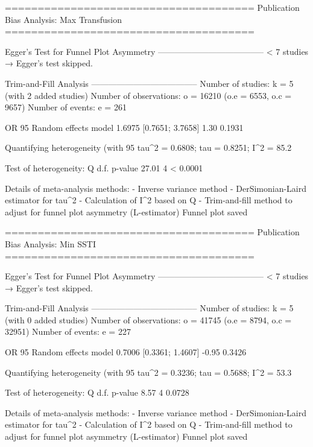 ======================================
Publication Bias Analysis: Max Transfusion 
======================================
                                                                                                                                                        
Egger's Test for Funnel Plot Asymmetry
--------------------------------------
  < 7 studies → Egger’s test skipped.

Trim-and-Fill Analysis
--------------------------------------
Number of studies: k = 5 (with 2 added studies)
Number of observations: o = 16210 (o.e = 6553, o.c = 9657)
Number of events: e = 261

                         OR           95%
Random effects model 1.6975 [0.7651; 3.7658] 1.30  0.1931

Quantifying heterogeneity (with 95%
 tau^2 = 0.6808; tau = 0.8251; I^2 = 85.2%

Test of heterogeneity:
     Q d.f.  p-value
 27.01    4 < 0.0001

Details of meta-analysis methods:
- Inverse variance method
- DerSimonian-Laird estimator for tau^2
- Calculation of I^2 based on Q
- Trim-and-fill method to adjust for funnel plot asymmetry (L-estimator)
  Funnel plot saved

======================================
Publication Bias Analysis: Min SSTI 
======================================
                                                                                                                                                        
Egger's Test for Funnel Plot Asymmetry
--------------------------------------
  < 7 studies → Egger’s test skipped.

Trim-and-Fill Analysis
--------------------------------------
Number of studies: k = 5 (with 0 added studies)
Number of observations: o = 41745 (o.e = 8794, o.c = 32951)
Number of events: e = 227

                         OR           95%
Random effects model 0.7006 [0.3361; 1.4607] -0.95  0.3426

Quantifying heterogeneity (with 95%
 tau^2 = 0.3236; tau = 0.5688; I^2 = 53.3%

Test of heterogeneity:
    Q d.f. p-value
 8.57    4  0.0728

Details of meta-analysis methods:
- Inverse variance method
- DerSimonian-Laird estimator for tau^2
- Calculation of I^2 based on Q
- Trim-and-fill method to adjust for funnel plot asymmetry (L-estimator)
  Funnel plot saved

